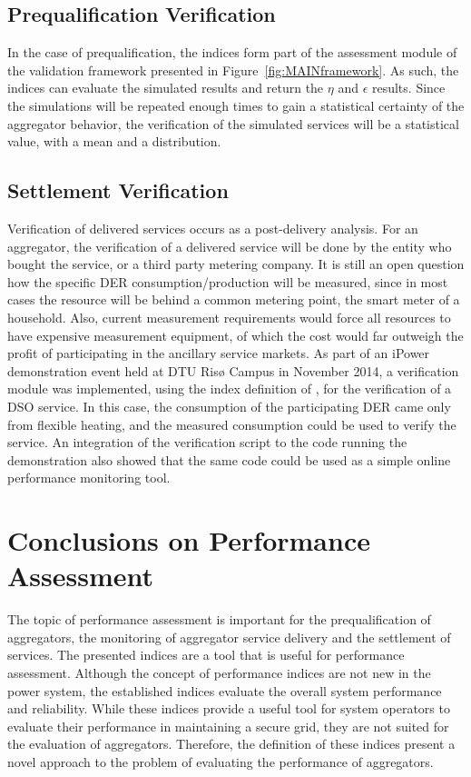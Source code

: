 \subsection{Prequalification Verification}
In the case of prequalification, the indices form part of the assessment module of the validation framework presented in Figure~\ref{fig:MAINframework}. As such, the indices can evaluate the simulated results and return the $\eta$ and $\epsilon$ results. Since the simulations will be repeated enough times to gain a statistical certainty of the aggregator behavior, the verification of the simulated services will be a statistical value, \eg with a mean and a distribution.

\subsection{Settlement Verification}
Verification of delivered services occurs as a post-delivery analysis. For an aggregator, the verification of a delivered service will be done by the entity who bought the service, or a third party metering company. It is still an open question how the specific DER consumption/production will be measured, since in most cases the resource will be behind a common metering point, \eg the smart meter of a household. Also, current measurement requirements would force all resources to have expensive measurement equipment, of which the cost would far outweigh the profit of participating in the ancillary service markets. As part of an iPower demonstration event held at DTU Risø Campus in November 2014, a verification module was implemented, using the index definition of \cite{bondy2014performance}, for the verification of a DSO service. In this case, the consumption of the participating DER came only from flexible heating, and the measured consumption could be used to verify the service. An integration of the verification script to the code running the demonstration also showed that the same code could be used as a simple online performance monitoring tool.

\section{Conclusions on Performance Assessment}
The topic of performance assessment is important for the prequalification of aggregators, the monitoring of aggregator service delivery and the settlement of services. The presented indices are a tool that is useful for performance assessment. Although the concept of performance indices are not new in the power system, the established indices evaluate the overall system performance and reliability. While these indices provide a useful tool for system operators to evaluate their performance in maintaining a secure grid, they are not suited for the evaluation of aggregators. Therefore, the definition of these indices present a novel approach to the problem of evaluating the performance of aggregators.

